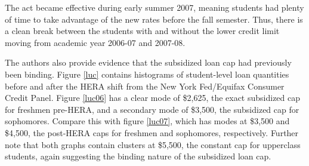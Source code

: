 \documentclass{article}
\begin{document}
	The act became effective during early summer 2007, meaning students had plenty of time to take advantage of the new rates before the fall semester. Thus, there is a clean break between the students with and without the lower credit limit moving from academic year 2006-07 and 2007-08.
	
	The authors also provide evidence that the subsidized loan cap had previously been binding. Figure \ref{luc} contains histograms of student-level loan quantities before and after the HERA shift from the New York Fed/Equifax Consumer Credit Panel. Figure \ref{luc06} has a clear mode of \$2,625, the exact subsidized cap for freshmen pre-HERA, and a secondary mode of \$3,500, the subsidized cap for sophomores. Compare this with figure \ref{luc07}, which has modes at \$3,500 and \$4,500, the post-HERA caps for freshmen and sophomores, respectively. Further note that both graphs contain clusters at \$5,500, the constant cap for upperclass students, again suggesting the binding nature of the subsidized loan cap. 
	
\end{document}
